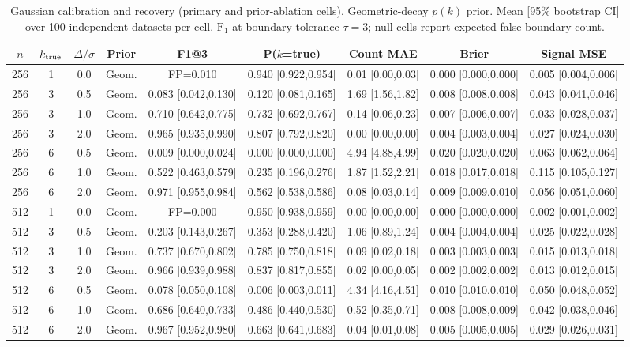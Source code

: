 \begin{table}[!htbp]
\centering
\footnotesize
\caption{Gaussian calibration and recovery (primary and prior-ablation cells). Geometric-decay $p(k)$ prior. Mean [95\% bootstrap CI] over 100 independent datasets per cell. $\mathrm{F_1}$ at boundary tolerance $\tau=3$; null cells report expected false-boundary count.}
\label{tab:E01-recovery-paper}
\begin{tabular}{ccccccccc}
\toprule
$n$ & $k_{\rm true}$ & $\Delta/\sigma$ & Prior & F1@3 & P($k$=true) & Count MAE & Brier & Signal MSE \\
\midrule
256 & 1 & 0.0 & Geom. & FP=0.010 & 0.940 [0.922,0.954] & 0.01 [0.00,0.03] & 0.000 [0.000,0.000] & 0.005 [0.004,0.006] \\
256 & 3 & 0.5 & Geom. & 0.083 [0.042,0.130] & 0.120 [0.081,0.165] & 1.69 [1.56,1.82] & 0.008 [0.008,0.008] & 0.043 [0.041,0.046] \\
256 & 3 & 1.0 & Geom. & 0.710 [0.642,0.775] & 0.732 [0.692,0.767] & 0.14 [0.06,0.23] & 0.007 [0.006,0.007] & 0.033 [0.028,0.037] \\
256 & 3 & 2.0 & Geom. & 0.965 [0.935,0.990] & 0.807 [0.792,0.820] & 0.00 [0.00,0.00] & 0.004 [0.003,0.004] & 0.027 [0.024,0.030] \\
256 & 6 & 0.5 & Geom. & 0.009 [0.000,0.024] & 0.000 [0.000,0.000] & 4.94 [4.88,4.99] & 0.020 [0.020,0.020] & 0.063 [0.062,0.064] \\
256 & 6 & 1.0 & Geom. & 0.522 [0.463,0.579] & 0.235 [0.196,0.276] & 1.87 [1.52,2.21] & 0.018 [0.017,0.018] & 0.115 [0.105,0.127] \\
256 & 6 & 2.0 & Geom. & 0.971 [0.955,0.984] & 0.562 [0.538,0.586] & 0.08 [0.03,0.14] & 0.009 [0.009,0.010] & 0.056 [0.051,0.060] \\
\midrule
512 & 1 & 0.0 & Geom. & FP=0.000 & 0.950 [0.938,0.959] & 0.00 [0.00,0.00] & 0.000 [0.000,0.000] & 0.002 [0.001,0.002] \\
512 & 3 & 0.5 & Geom. & 0.203 [0.143,0.267] & 0.353 [0.288,0.420] & 1.06 [0.89,1.24] & 0.004 [0.004,0.004] & 0.025 [0.022,0.028] \\
512 & 3 & 1.0 & Geom. & 0.737 [0.670,0.802] & 0.785 [0.750,0.818] & 0.09 [0.02,0.18] & 0.003 [0.003,0.003] & 0.015 [0.013,0.018] \\
512 & 3 & 2.0 & Geom. & 0.966 [0.939,0.988] & 0.837 [0.817,0.855] & 0.02 [0.00,0.05] & 0.002 [0.002,0.002] & 0.013 [0.012,0.015] \\
512 & 6 & 0.5 & Geom. & 0.078 [0.050,0.108] & 0.006 [0.003,0.011] & 4.34 [4.16,4.51] & 0.010 [0.010,0.010] & 0.050 [0.048,0.052] \\
512 & 6 & 1.0 & Geom. & 0.686 [0.640,0.733] & 0.486 [0.440,0.530] & 0.52 [0.35,0.71] & 0.008 [0.008,0.009] & 0.042 [0.038,0.046] \\
512 & 6 & 2.0 & Geom. & 0.967 [0.952,0.980] & 0.663 [0.641,0.683] & 0.04 [0.01,0.08] & 0.005 [0.005,0.005] & 0.029 [0.026,0.031] \\
\bottomrule
\end{tabular}
\end{table}
